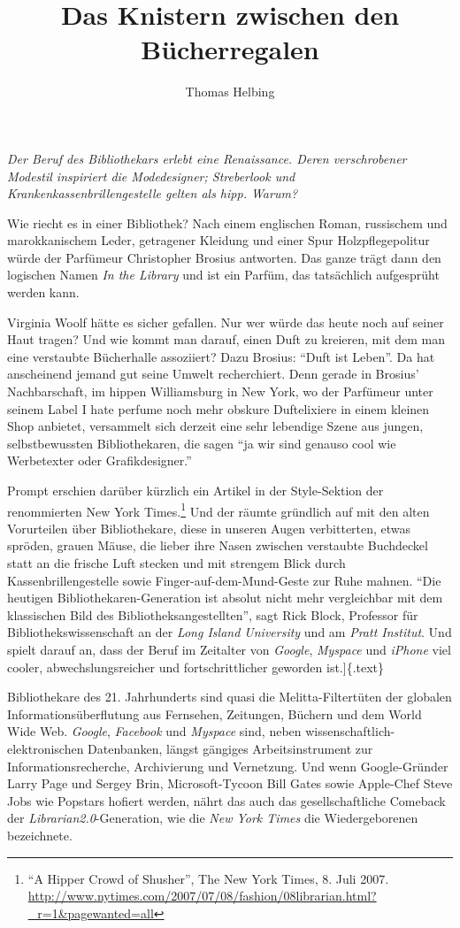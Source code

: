 \documentclass[output=paper]{langscibook}
\title{Das Knistern zwischen den Bücherregalen}
\author{Thomas Helbing}
\begin{document}

\emph{Der Beruf des Bibliothekars erlebt eine Renaissance. Deren
verschrobener Modestil inspiriert die Modedesigner; Streberlook und
Krankenkassenbrillengestelle gelten als hipp. Warum?}

Wie riecht es in einer Bibliothek? Nach einem englischen Roman,
russischem und marokkanischem Leder, getragener Kleidung und einer Spur
Holzpflegepolitur würde der Parfümeur Christopher Brosius antworten. Das
ganze trägt dann den logischen Namen \emph{In the Library} und ist ein
Parfüm, das tatsächlich aufgesprüht werden kann.

Virginia Woolf hätte es sicher gefallen. Nur wer würde das heute noch
auf seiner Haut tragen? Und wie kommt man darauf, einen Duft zu
kreieren, mit dem man eine verstaubte Bücherhalle assoziiert? Dazu
Brosius: ``Duft ist Leben''. Da hat anscheinend jemand gut seine Umwelt
recherchiert. Denn gerade in Brosius' Nachbarschaft, im hippen
Williamsburg in New York, wo der Parfümeur unter seinem Label I hate
perfume noch mehr obskure Duftelixiere in einem kleinen Shop anbietet,
versammelt sich derzeit eine sehr lebendige Szene aus jungen,
selbstbewussten Bibliothekaren, die sagen ``ja wir sind genauso cool wie
Werbetexter oder Grafikdesigner.''

Prompt erschien darüber kürzlich ein Artikel in der Style-Sektion der
renommierten New York Times.\footnote{``A Hipper Crowd of Shusher'', The
  New York Times, 8. Juli 2007.
  \url{http://www.nytimes.com/2007/07/08/fashion/08librarian.html?_r=1\&pagewanted=all}}
Und der räumte gründlich auf mit den alten Vorurteilen über
Bibliothekare, diese in unseren Augen verbitterten, etwas spröden,
grauen Mäuse, die lieber ihre Nasen zwischen verstaubte Buchdeckel statt
an die frische Luft stecken und mit strengem Blick durch
Kassenbrillengestelle sowie Finger-auf-dem-Mund-Geste zur Ruhe mahnen.
``Die heutigen Bibliothekaren-Generation ist absolut nicht mehr
vergleichbar mit dem klassischen Bild des Bibliotheksangestellten'',
sagt Rick Block, Professor für Bibliothekswissenschaft an der \emph{Long
Island University} und am \emph{Pratt Institut}. Und spielt darauf an,
dass der Beruf im Zeitalter von \emph{Google}, \emph{Myspace} und
\emph{iPhone} viel cooler, abwechslungsreicher und fortschrittlicher
geworden ist.{]}\{.text\}

Bibliothekare des 21. Jahrhunderts sind quasi die Melitta-Filtertüten
der globalen Informationsüberflutung aus Fernsehen, Zeitungen, Büchern
und dem World Wide Web. \emph{Google}, \emph{Facebook} und
\emph{Myspace} sind, neben wissenschaftlich-elektronischen Datenbanken,
längst gängiges Arbeitsinstrument zur Informationsrecherche,
Archivierung und Vernetzung. Und wenn Google-Gründer Larry Page und
Sergey Brin, Microsoft-Tycoon Bill Gates sowie Apple-Chef Steve Jobs wie
Popstars hofiert werden, nährt das auch das gesellschaftliche Comeback
der \emph{Librarian2.0}-Generation, wie die \emph{New York Times} die
Wiedergeborenen bezeichnete.
\end{document}
